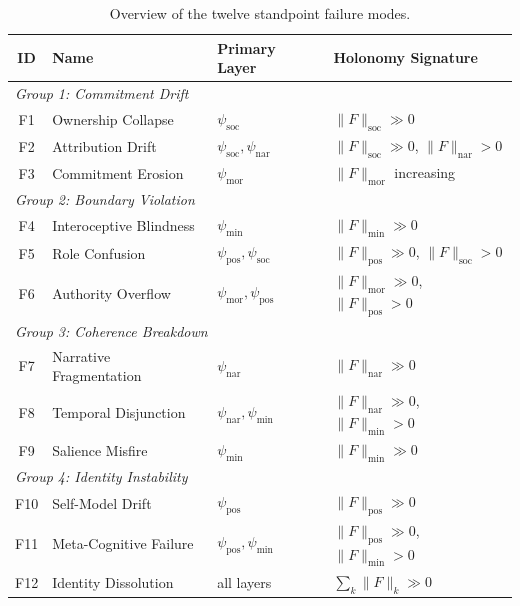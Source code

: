 \begin{table}[t]
\centering
\caption{Overview of the twelve standpoint failure modes.}
\label{tab:taxonomy-overview}
\small
\begin{tabular}{@{}clll@{}}
\toprule
\textbf{ID} & \textbf{Name} & \textbf{Primary Layer} & \textbf{Holonomy Signature} \\
\midrule
\multicolumn{4}{l}{\textit{Group 1: Commitment Drift}} \\
F1 & Ownership Collapse & $\psi_{\mathrm{soc}}$ & $\|F\|_{\mathrm{soc}} \gg 0$ \\
F2 & Attribution Drift & $\psi_{\mathrm{soc}}, \psi_{\mathrm{nar}}$ &
    $\|F\|_{\mathrm{soc}} \gg 0$, $\|F\|_{\mathrm{nar}} > 0$ \\
F3 & Commitment Erosion & $\psi_{\mathrm{mor}}$ &
    $\|F\|_{\mathrm{mor}}$ increasing \\
\midrule
\multicolumn{4}{l}{\textit{Group 2: Boundary Violation}} \\
F4 & Interoceptive Blindness & $\psi_{\min}$ & $\|F\|_{\min} \gg 0$ \\
F5 & Role Confusion & $\psi_{\mathrm{pos}}, \psi_{\mathrm{soc}}$ &
    $\|F\|_{\mathrm{pos}} \gg 0$, $\|F\|_{\mathrm{soc}} > 0$ \\
F6 & Authority Overflow & $\psi_{\mathrm{mor}}, \psi_{\mathrm{pos}}$ &
    $\|F\|_{\mathrm{mor}} \gg 0$, $\|F\|_{\mathrm{pos}} > 0$ \\
\midrule
\multicolumn{4}{l}{\textit{Group 3: Coherence Breakdown}} \\
F7 & Narrative Fragmentation & $\psi_{\mathrm{nar}}$ &
    $\|F\|_{\mathrm{nar}} \gg 0$ \\
F8 & Temporal Disjunction & $\psi_{\mathrm{nar}}, \psi_{\min}$ &
    $\|F\|_{\mathrm{nar}} \gg 0$, $\|F\|_{\min} > 0$ \\
F9 & Salience Misfire & $\psi_{\min}$ & $\|F\|_{\min} \gg 0$ \\
\midrule
\multicolumn{4}{l}{\textit{Group 4: Identity Instability}} \\
F10 & Self-Model Drift & $\psi_{\mathrm{pos}}$ & $\|F\|_{\mathrm{pos}} \gg 0$ \\
F11 & Meta-Cognitive Failure & $\psi_{\mathrm{pos}}, \psi_{\min}$ &
    $\|F\|_{\mathrm{pos}} \gg 0$, $\|F\|_{\min} > 0$ \\
F12 & Identity Dissolution & all layers & $\sum_k \|F\|_k \gg 0$ \\
\bottomrule
\end{tabular}
\end{table}

